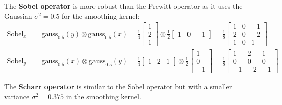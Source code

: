 \documentclass[a4paper,11pt]{article}
\begin{document}
The \textbf{Sobel operator} is more robust than the Prewitt operator as it uses the Gaussian $\sigma^2 = 0.5$ for the smoothing kernel:
\begin{align*}
    \text{Sobel}_x =& \text{gauss}_{0.5}(y) \otimes \text{gauss}_{0.5}(x)
    = \frac{1}{4}
    \begin{bmatrix}
        1 \\
        2 \\
        1
    \end{bmatrix}
    \otimes
    \frac{1}{2}
    \begin{bmatrix}
        1 & 0 & -1
    \end{bmatrix}
    = \frac{1}{8}
    \begin{bmatrix}
        1 & 0 & -1 \\
        2 & 0 & -2 \\
        1 & 0 & 1
    \end{bmatrix} \\
    \text{Sobel}_y =& \text{gauss}_{0.5}(x) \otimes \text{gauss}_{0.5}(y)
    = \frac{1}{4}
    \begin{bmatrix}
        1 & 2 & 1
    \end{bmatrix}
    \otimes
    \frac{1}{2}
    \begin{bmatrix}
        1 \\
        0 \\
        -1
    \end{bmatrix}
    = \frac{1}{8}
    \begin{bmatrix}
        1 & 2 & 1 \\
        0 & 0 & 0 \\
        -1 & -2 & -1
    \end{bmatrix}
\end{align*}

The \textbf{Scharr operator} is similar to the Sobel operator but with a smaller variance $\sigma^2 = 0.375$ in the smoothing kernel.
\end{document}
